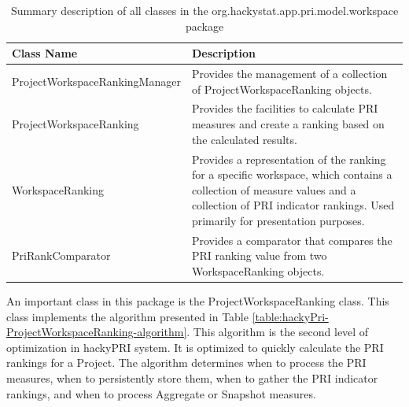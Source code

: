 \begin{table}[htbp]
  \begin{center}
    \caption[The workspace package]{Summary description of all classes in the 
      org.hackystat.app.pri.model.workspace package}
    \label{table:hackyPri-workspacepackage}
    \begin{tabular}{|p{6.0cm}|p{8.0cm}|} \hline
      {\bf Class Name} & {\bf Description} \\ \hline

ProjectWorkspaceRankingManager & Provides the management of a collection of 
ProjectWorkspaceRanking objects. \\ \hline

ProjectWorkspaceRanking & Provides the facilities to calculate PRI measures 
and create a ranking based on the calculated results.\\ \hline

WorkspaceRanking & Provides a representation of the ranking for a specific
workspace, which contains a collection of measure values and a collection
of PRI indicator rankings. Used primarily for presentation purposes. \\ \hline 

PriRankComparator & Provides a comparator that compares the PRI ranking
value from two WorkspaceRanking objects. \\ \hline
    \end{tabular}
  \end{center}
\end{table}

An important class in this package is the ProjectWorkspaceRanking class.
This class implements the algorithm presented in Table
\ref{table:hackyPri-ProjectWorkspaceRanking-algorithm}. This algorithm is
the second level of optimization in hackyPRI system. It is optimized to
quickly calculate the PRI rankings for a Project. The algorithm determines
when to process the PRI measures, when to persistently store them, when to
gather the PRI indicator rankings, and when to process Aggregate or
Snapshot measures.

